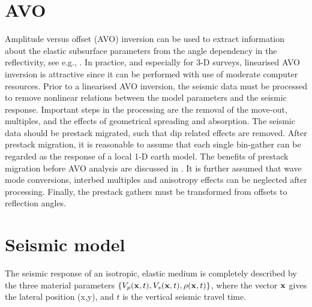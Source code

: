 \section{AVO}
Amplitude versus offset (AVO) inversion can be used to extract
information about the elastic subsurface parameters from the angle
dependency in the reflectivity, see e.g.,
\cite{hamp90,lort93,pan94,bula96b}. In practice, and especially for
3-D surveys, linearised AVO inversion is attractive since it can be
performed with use of moderate computer resources. Prior to a
linearised AVO inversion, the seismic data must be processed to remove
nonlinear relations between the model parameters and the seismic
response. Important steps in the processing are the removal of the
move-out, multiples, and the effects of geometrical spreading and
absorption. The seismic data should be prestack migrated, such that
dip related effects are removed. After prestack migration, it is
reasonable to assume that each single bin-gather can be regarded as
the response of a local 1-D earth model. The benefits of prestack
migration before AVO analysis are discussed in
\cite{brow92,mosh96,bula2001d}. It is further assumed that wave mode
conversions, interbed multiples and  anisotropy effects can be
neglected after processing.  Finally, the prestack gathers must be
transformed from offsets to reflection angles.

\section{Seismic model}

The seismic response of an isotropic, elastic medium is completely
described by the three material parameters $\{V_p(\mathbf{x},t),
V_s(\mathbf{x},t), \rho(\mathbf{x},t)\}$, where the vector $\mathbf{x}$
gives the lateral position (x,y), and $t$ is the vertical seismic
travel time.

